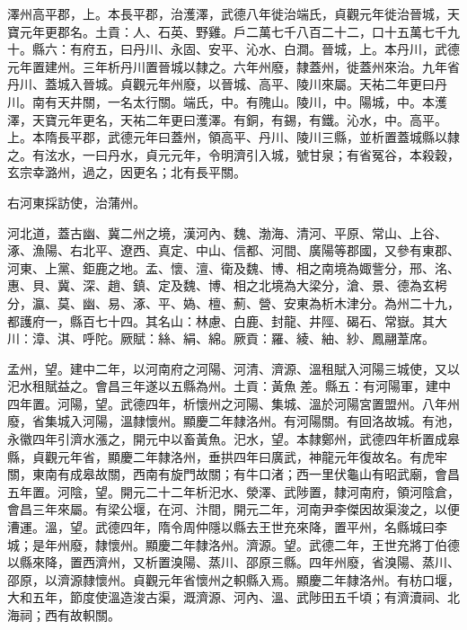 \begin{pinyinscope}
 澤州高平郡，上。本長平郡，治濩澤，武德八年徙治端氏，貞觀元年徙治晉城，天寶元年更郡名。土貢：人、石英、野雞。戶二萬七千八百二十二，口十五萬七千九十。縣六：有府五，曰丹川、永固、安平、沁水、白澗。晉城，上。本丹川，武德元年置建州。三年析丹川置晉城以隸之。六年州廢，隸蓋州，徙蓋州來治。九年省丹川、蓋城入晉城。貞觀元年州廢，以晉城、高平、陵川來屬。天祐二年更曰丹川。南有天井關，一名太行關。端氏，中。有隗山。陵川，中。陽城，中。本濩澤，天寶元年更名，天祐二年更曰濩澤。有銅，有錫，有鐵。沁水，中。高平。上。本隋長平郡，武德元年曰蓋州，領高平、丹川、陵川三縣，並析置蓋城縣以隸之。有泫水，一曰丹水，貞元元年，令明濟引入城，號甘泉；有省冤谷，本殺穀，玄宗幸潞州，過之，因更名；北有長平關。



 右河東採訪使，治蒲州。



 河北道，蓋古幽、冀二州之境，漢河內、魏、渤海、清河、平原、常山、上谷、涿、漁陽、右北平、遼西、真定、中山、信都、河間、廣陽等郡國，又參有東郡、河東、上黨、鉅鹿之地。孟、懷、澶、衛及魏、博、相之南境為娵訾分，邢、洺、惠、貝、冀、深、趙、鎮、定及魏、博、相之北境為大梁分，滄、景、德為玄枵分，瀛、莫、幽、易、涿、平、媯、檀、薊、營、安東為析木津分。為州二十九，都護府一，縣百七十四。其名山：林慮、白鹿、封龍、井陘、碣石、常嶽。其大川：漳、淇、呼陀。厥賦：絲、絹、綿。厥貢：羅、綾、紬、紗、鳳翮葦席。



 孟州，望。建中二年，以河南府之河陽、河清、濟源、溫租賦入河陽三城使，又以汜水租賦益之。會昌三年遂以五縣為州。土貢：黃魚差。縣五：有河陽軍，建中四年置。河陽，望。武德四年，析懷州之河陽、集城、溫於河陽宮置盟州。八年州廢，省集城入河陽，溫隸懷州。顯慶二年隸洛州。有河陽關。有回洛故城。有池，永徽四年引濟水漲之，開元中以畜黃魚。汜水，望。本隸鄭州，武德四年析置成皋縣，貞觀元年省，顯慶二年隸洛州，垂拱四年曰廣武，神龍元年復故名。有虎牢關，東南有成皋故關，西南有旋門故關；有牛口渚；西一里伏龜山有昭武廟，會昌五年置。河陰，望。開元二十二年析汜水、滎澤、武陟置，隸河南府，領河陰倉，會昌三年來屬。有梁公堰，在河、汴間，開元二年，河南尹李傑因故渠浚之，以便漕運。溫，望。武德四年，隋令周仲隱以縣去王世充來降，置平州，名縣城曰李城；是年州廢，隸懷州。顯慶二年隸洛州。濟源。望。武德二年，王世充將丁伯德以縣來降，置西濟州，又析置溴陽、蒸川、邵原三縣。四年州廢，省溴陽、蒸川、邵原，以濟源隸懷州。貞觀元年省懷州之軹縣入焉。顯慶二年隸洛州。有枋口堰，大和五年，節度使溫造浚古渠，溉濟源、河內、溫、武陟田五千頃；有濟瀆祠、北海祠；西有故軹關。




\end{pinyinscope}
